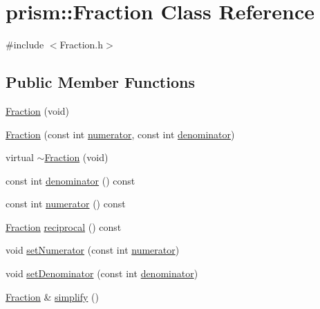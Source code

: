 \hypertarget{classprism_1_1_fraction}{}\section{prism\+:\+:Fraction Class Reference}
\label{classprism_1_1_fraction}


{\ttfamily \#include $<$Fraction.\+h$>$}

\subsection*{Public Member Functions}
\begin{DoxyCompactItemize}
\item 
\hyperlink{classprism_1_1_fraction_ae66446d8d2130582811d17e547dd25e4}{Fraction} (void)
\item 
\hyperlink{classprism_1_1_fraction_ae6458e0578c2ddd59ce718b7808ca0ec}{Fraction} (const int \hyperlink{classprism_1_1_fraction_a1991d357549c20236a7e3008ddcc10a7}{numerator}, const int \hyperlink{classprism_1_1_fraction_af0f39f599394258c248f375c88e9c9d4}{denominator})
\item 
virtual \hyperlink{classprism_1_1_fraction_a1a7170988796417122c670c2139dc933}{$\sim$\+Fraction} (void)
\item 
const int \hyperlink{classprism_1_1_fraction_af0f39f599394258c248f375c88e9c9d4}{denominator} () const 
\item 
const int \hyperlink{classprism_1_1_fraction_a1991d357549c20236a7e3008ddcc10a7}{numerator} () const 
\item 
\hyperlink{classprism_1_1_fraction}{Fraction} \hyperlink{classprism_1_1_fraction_aab12f13967ca16e8956618f9d0641c31}{reciprocal} () const 
\item 
void \hyperlink{classprism_1_1_fraction_aeaa287cd1b228f2038b13e2bd54d5c96}{set\+Numerator} (const int \hyperlink{classprism_1_1_fraction_a1991d357549c20236a7e3008ddcc10a7}{numerator})
\item 
void \hyperlink{classprism_1_1_fraction_ac4ab0a9b891910381813f16ebc0261fa}{set\+Denominator} (const int \hyperlink{classprism_1_1_fraction_af0f39f599394258c248f375c88e9c9d4}{denominator})
\item 
\hyperlink{classprism_1_1_fraction}{Fraction} \& \hyperlink{classprism_1_1_fraction_ab30164e43aa9ce13ad3dc364b8711473}{simplify} ()
\end{DoxyCompactItemize}
